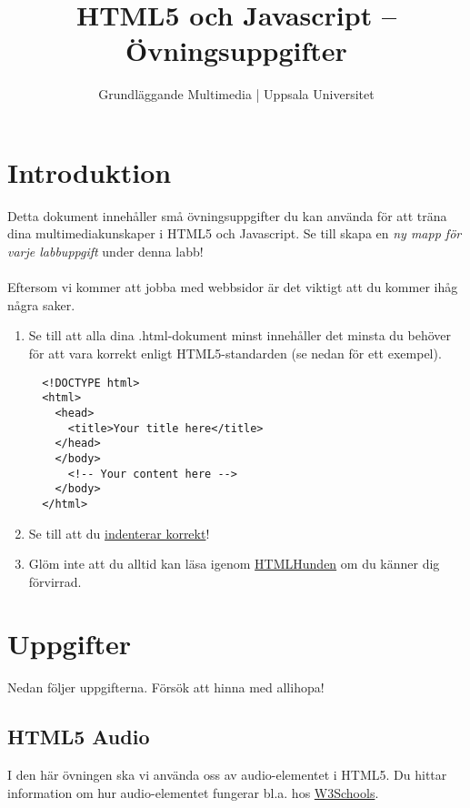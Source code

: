 \documentclass{article}
\begin{document}
  \title{ HTML5 och Javascript -- Övningsuppgifter }
  \author{ Grundläggande Multimedia | Uppsala Universitet }
  \date{}
  \maketitle


  \section{ Introduktion }
    Detta dokument innehåller små övningsuppgifter du kan använda för att träna dina multimediakunskaper i HTML5 och Javascript. Se till skapa en \emph{ny mapp för varje labbuppgift} under denna labb!


  \paragraph{}
  Eftersom vi kommer att jobba med webbsidor är det viktigt att du kommer ihåg några saker.
    \begin{enumerate}
      \item Se till att alla dina .html-dokument minst innehåller det minsta du behöver för att vara korrekt enligt HTML5-standarden (se nedan för ett exempel).
            \lstset{language=HTML}
            \begin{lstlisting}
  <!DOCTYPE html>
  <html>
    <head>
      <title>Your title here</title>
    </head>
    </body>
      <!-- Your content here -->
    </body>
  </html>
            \end{lstlisting}
      \item Se till att du \href{http://htmlhunden.se/#indentering}{indenterar korrekt}!
      \item Glöm inte att du alltid kan läsa igenom \href{http://htmlhunden.se}{HTMLHunden} om du känner dig förvirrad.
    \end{enumerate}


  \section{ Uppgifter }
  Nedan följer uppgifterna. Försök att hinna med allihopa!


  \subsection{ HTML5 Audio }
    I den här övningen ska vi använda oss av audio-elementet i HTML5. Du hittar information om hur audio-elementet fungerar bl.a. hos \href{http://www.w3schools.com/html/html5_audio.asp}{W3Schools}.
\end{document}
